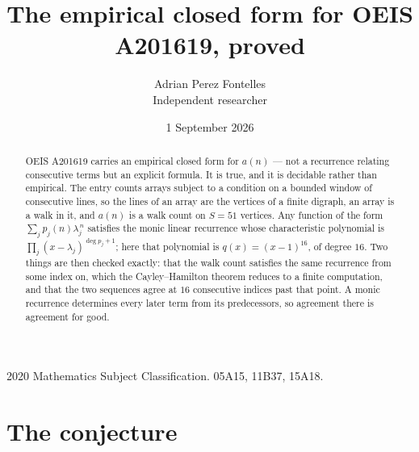 \documentclass[11pt,a4paper]{article}
\title{The empirical closed form for OEIS A201619, proved}
\author{Adrian Perez Fontelles\\ \small Independent researcher}
\date{1 September 2026}
\theoremstyle{plain}
\theoremstyle{definition}
\begin{document}
\maketitle

\begin{abstract}
OEIS A201619 carries an empirical closed form for $a(n)$ --- not a recurrence relating
consecutive terms but an explicit formula. It is true, and it is decidable rather than
empirical. The entry counts arrays subject to a condition on a bounded window of consecutive lines, so the lines of an array are the
vertices of a finite digraph, an array is a walk in it, and $a(n)$ is a walk count on
$S=51$ vertices. Any function of the form $\sum_j p_j(n)\lambda_j^{\,n}$ satisfies the
monic linear recurrence whose characteristic polynomial is
$\prod_j(x-\lambda_j)^{\deg p_j+1}$; here that polynomial is $q(x)=(x-1)^{16}$, of degree
$16$. Two things are then checked exactly: that the walk count satisfies the same
recurrence from some index on, which the Cayley--Hamilton theorem reduces to a finite
computation, and that the two sequences agree at $16$ consecutive indices past that
point. A monic recurrence determines every later term from its predecessors, so agreement
there is agreement for good.
\end{abstract}

\noindent\small 2020 Mathematics Subject Classification. 05A15, 11B37, 15A18.\normalsize

\section{The conjecture}
\end{document}
